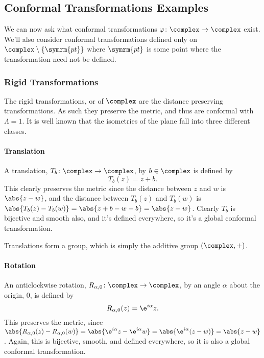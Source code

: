 \documentclass[fleqn]{NotesClass}
\newcommand{\pt}{\symrm{pt}}
\begin{document}
    \subsection{Conformal Transformations Examples}
    We can now ask what conformal transformations \(\varphi \colon \complex \to \complex\) exist.
    We'll also consider conformal transformations defined only on \(\complex\setminus\{\pt\}\) where \(\pt\) is some point where the transformation need not be defined.
    
    \subsubsection{Rigid Transformations}
    The rigid transformations, or  of \(\complex\) are the distance preserving transformations.
    As such they preserve the metric, and thus are conformal with \(\Lambda = 1\).
    It is well known that the isometries of the plane fall into three different classes.
    
    \paragraph{Translation}
    A translation, \(T_b \colon \complex \to \complex\), by \(b \in \complex\) is defined by
    \begin{equation}
        T_b(z) = z + b.
    \end{equation}
    This clearly preserves the metric since the distance between \(z\) and \(w\) is \(\abs{z - w}\), and the distance between \(T_b(z)\) and \(T_b(w)\) is \(\abs{T_b(z) - T_b(w)} = \abs{z + b - w - b} = \abs{z - w}\).
    Clearly \(T_b\) is bijective and smooth also, and it's defined everywhere, so it's a global conformal transformation.
    
    Translations form a group, which is simply the additive group \((\complex, +)\).
    
    \paragraph{Rotation}
    An anticlockwise rotation, \(R_{\alpha, 0} \colon \complex \to \complex\), by an angle \(\alpha\) about the origin, \(0\), is defined by
    \begin{equation}
        R_{\alpha, 0}(z) = \e^{i\alpha}z.
    \end{equation}
    This preserves the metric, since \(\abs{R_{\alpha, 0}(z) - R_{\alpha, 0}(w)} = \abs{\e^{i\alpha}z - \e^{i\alpha}w} = \abs{\e^{i\alpha}(z - w)} = \abs{z - w}\).
    Again, this is bijective, smooth, and defined everywhere, so it is also a global conformal transformation.
    
\end{document}
